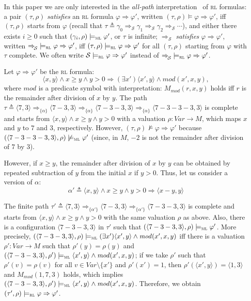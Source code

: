 \documentclass[conference]{IEEEtran}
\newcommand{\M}{\mathit{M}}
\newcommand{\eqbydef}{\triangleq}
\renewcommand{\S}{\mathcal{S}}
\newcommand{\tran}[2]{\Ra^{\!#1}_{\!#2}}
\newcommand{\Ra}{\Rightarrow}
\newcommand{\Var}{\mathit{Var}}
\newcommand{\ML}{\textsc{ml}\xspace}
\newcommand{\RL}{\textsc{rl}\xspace}
\newcommand{\rrule}[2]{{#1} \Ra{#2}}
\newcommand{\rarule}[2]{{#1} \Ra{#2}}
\newcommand{\modelsml}{\models_\ML}
\newcommand{\modelsrl}{\models_\RL}
\begin{document}
In this paper we are only interested in the \emph{all-path} interpretation~\cite{stefanescu-ciobaca-mereuta-moore-serbanuta-rosu-2014-rta} of \RL formulas:
a pair $(\tau,\rho)$  \emph{satisfies} an \RL formula $\rrule{\varphi}{\varphi'}$, written $(\tau,\rho)\models \rrule{\varphi}{\varphi'}$, iff $(\tau,\rho)$ starts from $\varphi$ (recall that $\tau \eqbydef \gamma_0 \tran{}{\S} \gamma_1 \tran{}{\S} \gamma_2 \tran{}{\S} \cdots$), and either there exists $i\ge 0$ such that $(\gamma_i,\rho)\modelsml\varphi'$, or $\tau$ is infinite; 
${\tran{}{\S}}$ \emph{satisfies} $\rarule{\varphi}{\varphi'}$, written ${\tran{}{\S}}\modelsrl \rarule{\varphi}{\varphi'}$, iff $(\tau,\rho) \modelsrl \rarule{\varphi}{\varphi'}$ for all  $(\tau,\rho)$ starting from $\varphi$ with $\tau$ complete.
We often write $\S\modelsrl \rarule{\varphi}{\varphi'}$ instead of ${\tran{}{\S}}\modelsrl \rarule{\varphi}{\varphi'}$.


Let $\rrule{\varphi}{\varphi'}$ be the \RL formula:
$$\rrule{\langle x, y \rangle \!\land\!x \geq y \!\land\! y > 0}{(\exists x')\langle x', y \rangle\!\land\!\mathit{mod}(x',x,y)},$$
where $\mathit{mod}$ is a predicate symbol with interpretation: $\M_\mathit{mod}(r, x, y)$ holds iff $r$ is the remainder after division of $x$ by $y$.
The path $\tau \eqbydef \langle 7, 3\rangle \tran{}{\{\alpha\}} \langle 7 - 3, 3\rangle \tran{}{\{\alpha\}} \langle 7 - 3 - 3 , 3\rangle \tran{}{\{\alpha\}} \langle 7 - 3 - 3 - 3 , 3\rangle$ is complete and starts from $\langle x, y \rangle \land x \geq y \land y > 0$ with a valuation $\rho:\Var \to \M$, which maps $x$ and $y$ to $7$ and $3$, respectively. 
However, $(\tau, \rho) \not\models \rrule{\varphi}{\varphi'}$ because $(\langle 7 - 3 - 3 - 3 , 3\rangle, \rho) \not\modelsml \varphi'$ (since, in $\M$, $-2$ is not the remainder after division of $7$ by $3$).

However, if $x \geq y$, the remainder after division of $x$ by $y$ can be obtained by repeated subtraction of $y$ from the initial $x$ if $y > 0$.
Thus, let us consider a  version of $\alpha$:
$$\alpha' \eqbydef \rrule{\langle x , y \rangle \land x \geq y \land y > 0}{\langle x - y, y \rangle}$$

\noindent
The finite path $\tau' \eqbydef \langle 7, 3\rangle \tran{}{\{\alpha'\}} \langle 7 - 3, 3\rangle \tran{}{\{\alpha'\}} \langle 7 - 3 - 3 , 3\rangle$ is complete and starts from $\langle x , y \rangle \land x \geq y \land y > 0$ with the same valuation $\rho$ as above.
Also, there is a configuration $\langle 7 - 3 - 3 , 3\rangle$ in $\tau'$ such that $(\langle 7 - 3 - 3 , 3\rangle, \rho) \modelsml \varphi'$.
More precisely, $(\langle 7-3 - 3 , 3\rangle, \rho) \modelsml (\exists x')\langle x', y \rangle \land \mathit{mod}(x',x,y)$ iff there is a valuation $\rho' : \Var \to \M$ such that $\rho'(y) = \rho(y)$ and $(\langle 7 - 3 - 3 , 3\rangle, \rho') \modelsml \langle x', y \rangle \land \mathit{mod}(x',x,y)$; 
if we take $\rho'$ such that $\rho'(v) = \rho(v)$ for all $v\in \Var \setminus \{ x' \}$ and $\rho'(x') = 1$, then  $\rho'(\langle x', y \rangle) = \langle 1, 3 \rangle$ and $\M_\mathit{mod}(1, 7, 3)$ holds, which implies $(\langle 7 - 3 - 3 , 3\rangle, \rho') \modelsml \langle x', y \rangle \land \mathit{mod}(x',x,y)$.
Therefore, we obtain $(\tau', \rho) \modelsrl \rrule{\varphi}{\varphi'}$.
\end{document}

